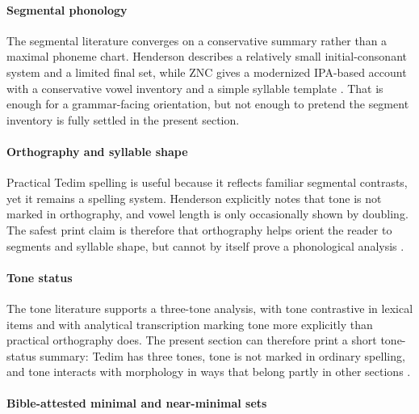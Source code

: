\documentclass[
  11pt,
  a4paper,
]{article}
\begin{document}
\paragraph{Segmental phonology}\label{segmental-phonology}

The segmental literature converges on a conservative summary rather than
a maximal phoneme chart. Henderson describes a relatively small
initial-consonant system and a limited final set, while ZNC gives a
modernized IPA-based account with a conservative vowel inventory and a
simple syllable template
\citetext{\citealp[pp.~9-13]{henderson1965}; \citealp[pp.~25-26,
37]{zamngaihcing2017}}. That is enough for a grammar-facing orientation,
but not enough to pretend the segment inventory is fully settled in the
present section.

\paragraph{Orthography and syllable
shape}\label{orthography-and-syllable-shape}

Practical Tedim spelling is useful because it reflects familiar
segmental contrasts, yet it remains a spelling system. Henderson
explicitly notes that tone is not marked in orthography, and vowel
length is only occasionally shown by doubling. The safest print claim is
therefore that orthography helps orient the reader to segments and
syllable shape, but cannot by itself prove a phonological analysis
\citetext{\citealp[pp.~9-11,
13]{henderson1965}; \citealp[pp.~25-26]{zamngaihcing2017}}.

\paragraph{Tone status}\label{tone-status}

The tone literature supports a three-tone analysis, with tone
contrastive in lexical items and with analytical transcription marking
tone more explicitly than practical orthography does. The present
section can therefore print a short tone-status summary: Tedim has three
tones, tone is not marked in ordinary spelling, and tone interacts with
morphology in ways that belong partly in other sections
\citetext{\citealp[p.~13]{henderson1965}; \citealp[pp.~57-60]{zamngaihcing2017}}.

\paragraph{Bible-attested minimal and near-minimal
sets}\label{bible-attested-minimal-and-near-minimal-sets}
\end{document}
